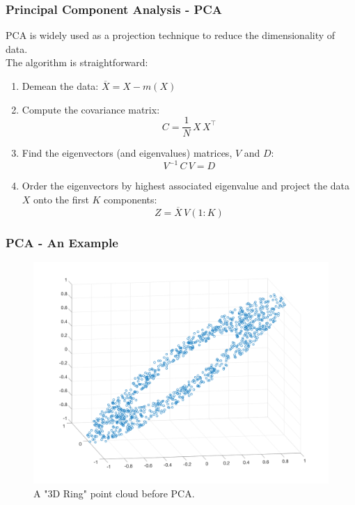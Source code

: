 \documentclass{beamer}
\begin{document}
\begin{frame}
	\frametitle{Principal Component Analysis - PCA}
	PCA is widely used as a projection technique to reduce the dimensionality of data. \\ The algorithm is straightforward:
	\begin{enumerate}
		\item Demean the data: $\overline{X} = X - m(X)$
		\item Compute the covariance matrix: \[ C = \frac{1}{N}\,X\,X^{\top}\]
		\item Find the eigenvectors (and eigenvalues) matrices, $V$ and $D$: \[ V^{-1}\,C\,V = D \]
		\item Order the eigenvectors by highest associated eigenvalue and project the data $X$ onto the first $K$ components: \[ Z = \overline{X}\,V(1:K) \]
	\end{enumerate}
\end{frame}

\begin{frame}
\frametitle{PCA - An Example}
	\begin{figure}[hbt]
\includegraphics[width=1\textwidth,height=0.7\textheight,keepaspectratio]{ring_3d}
  	\caption{\footnotesize{A "3D Ring" point cloud before PCA.}}
	\end{figure}
\end{frame}
\end{document}
